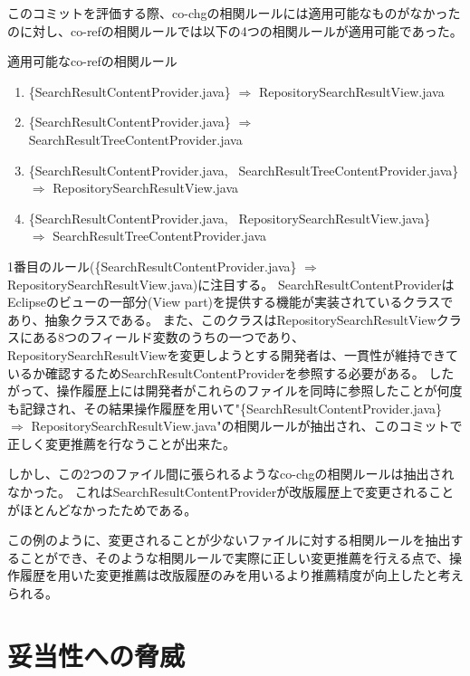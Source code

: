 \documentclass[a4paper]{jsbook}
\begin{document}
このコミットを評価する際、co-chgの相関ルールには適用可能なものがなかったのに対し、co-refの相関ルールでは以下の4つの相関ルールが適用可能であった。
\begin{itembox}{適用可能なco-refの相関ルール}
  \begin{enumerate}
    \item  \{SearchResultContentProvider.java\} $\Rightarrow$ RepositorySearchResultView.java
    \item \{SearchResultContentProvider.java\} $\Rightarrow$ SearchResultTreeContentProvider.java
    \item \{SearchResultContentProvider.java, ~SearchResultTreeContentProvider.java\} 
      \\$\Rightarrow$ RepositorySearchResultView.java
    \item \{SearchResultContentProvider.java, ~RepositorySearchResultView.java\} \\
  $\Rightarrow$ SearchResultTreeContentProvider.java
  \end{enumerate}
\end{itembox}

1番目のルール(\{SearchResultContentProvider.java\} $\Rightarrow$ RepositorySearchResultView.java)に注目する。
SearchResultContentProviderはEclipseのビューの一部分(View part)を提供する機能が実装されているクラスであり、抽象クラスである。
また、このクラスはRepositorySearchResultViewクラスにある8つのフィールド変数のうちの一つであり、
RepositorySearchResultViewを変更しようとする開発者は、一貫性が維持できているか確認するためSearchResultContentProviderを参照する必要がある。
したがって、操作履歴上には開発者がこれらのファイルを同時に参照したことが何度も記録され、その結果操作履歴を用いて"\{SearchResultContentProvider.java\} $\Rightarrow$ RepositorySearchResultView.java"の相関ルールが抽出され、このコミットで正しく変更推薦を行なうことが出来た。

しかし、この2つのファイル間に張られるようなco-chgの相関ルールは抽出されなかった。
これはSearchResultContentProviderが改版履歴上で変更されることがほとんどなかったためである。

この例のように、変更されることが少ないファイルに対する相関ルールを抽出することができ、そのような相関ルールで実際に正しい変更推薦を行える点で、操作履歴を用いた変更推薦は改版履歴のみを用いるより推薦精度が向上したと考えられる。

\section{妥当性への脅威}
\end{document}
